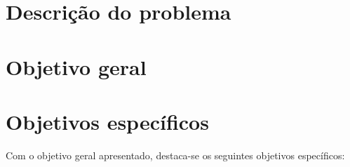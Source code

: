     \section{Descrição do problema}






    \section{Objetivo geral}



    \section{Objetivos específicos}

        Com o objetivo geral apresentado, destaca-se os seguintes objetivos específicos:







